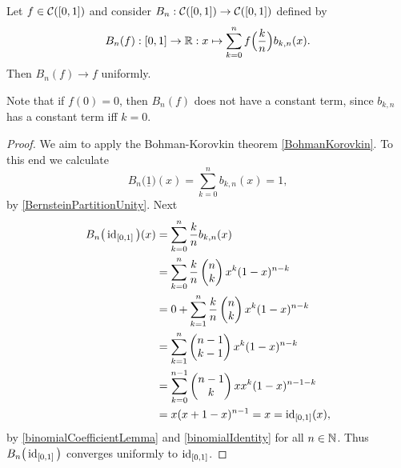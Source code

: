 \begin{proposition} \label{uniformApproximationByBernsteinPolynomials}
Let $f\in\cont(\interval{0,1})$ and consider $B_n: \cont(\interval{0,1}) \to \cont(\interval{0,1})$ defined by
\[ B_n(f): \interval{0,1} \to \R: x\mapsto \sum_{k=0}^nf\Big(\frac{k}{n}\Big)b_{k,n}(x). \]
Then $B_n(f) \to f$ uniformly.
\end{proposition}
Note that if $f(0) = 0$, then $B_n(f)$ does not have a constant term, since $b_{k,n}$ has a constant term iff $k=0$.
\begin{proof}
We aim to apply the Bohman-Korovkin theorem \ref{BohmanKorovkin}. To this end we calculate
\[ B_n\big(\underline{1}\big)(x) = \sum_{k=0}^nb_{k,n}(x) = 1, \]
by \ref{BernsteinPartitionUnity}. Next
\begin{align*}
B_n\big(\id_{\interval{0,1}}\big)(x) &= \sum_{k=0}^n \frac{k}{n}b_{k,n}(x) \\
&= \sum_{k=0}^n \frac{k}{n} \begin{pmatrix}
n \\ k
\end{pmatrix}x^k(1-x)^{n-k} \\
&= 0 + \sum_{k=1}^{n} \frac{k}{n}\begin{pmatrix}
n \\ k
\end{pmatrix}x^k(1-x)^{n-k} \\
&= \sum_{k=1}^{n} \begin{pmatrix}
n-1 \\ k-1
\end{pmatrix}x^k(1-x)^{n-k} \\
&= \sum_{k=0}^{n-1} \begin{pmatrix}
n-1 \\ k
\end{pmatrix}xx^{k}(1-x)^{n-1-k} \\
&= x (x + 1 - x)^{n-1} = x = \id_{\interval{0,1}}(x),
\end{align*}
by \ref{binomialCoefficientLemma} and \ref{binomialIdentity} for all $n\in \mathbb{N}$. Thus $B_n\big(\id_{\interval{0,1}}\big)$ converges uniformly to $\id_{\interval{0,1}}$.


\end{proof}
